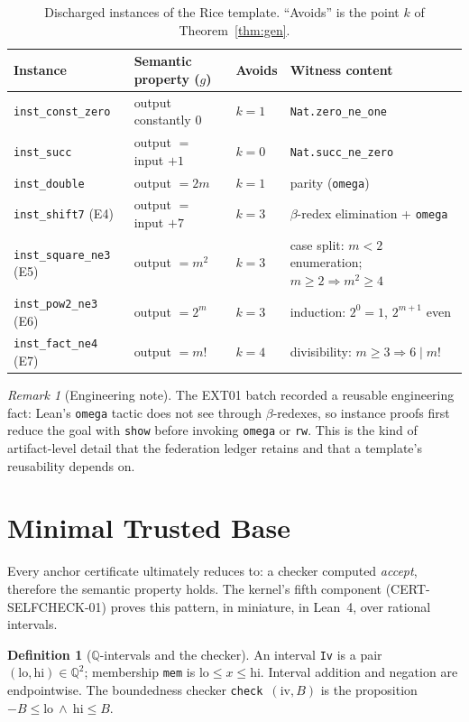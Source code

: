 \documentclass[11pt]{article}
\theoremstyle{definition}
\newtheorem{definition}[theorem]{Definition}
\theoremstyle{remark}
\newtheorem{remark}[theorem]{Remark}
\newcommand{\lean}[1]{\texttt{#1}}
\begin{document}
\begin{table}[t]
\centering
\caption{Discharged instances of the Rice template.
``Avoids'' is the point $k$ of Theorem~\ref{thm:gen}.}\label{tab:rice}
\begin{tabular}{llll}
\toprule
Instance & Semantic property ($g$) & Avoids & Witness content \\
\midrule
\lean{inst\_const\_zero} & output constantly $0$ & $k=1$ & \lean{Nat.zero\_ne\_one} \\
\lean{inst\_succ} & output $=$ input $+1$ & $k=0$ & \lean{Nat.succ\_ne\_zero} \\
\lean{inst\_double} & output $=2m$ & $k=1$ & parity (\texttt{omega}) \\
\lean{inst\_shift7} (E4) & output $=$ input $+7$ & $k=3$ & $\beta$-redex elimination + \texttt{omega} \\
\lean{inst\_square\_ne3} (E5) & output $=m^{2}$ & $k=3$ & case split: $m<2$ enumeration; $m\ge2\Rightarrow m^{2}\ge4$ \\
\lean{inst\_pow2\_ne3} (E6) & output $=2^{m}$ & $k=3$ & induction: $2^{0}=1$, $2^{m+1}$ even \\
\lean{inst\_fact\_ne4} (E7) & output $=m!$ & $k=4$ & divisibility: $m\ge3\Rightarrow 6\mid m!$ \\
\bottomrule
\end{tabular}
\end{table}

\begin{remark}[Engineering note]\label{rem:beta}
The EXT01 batch recorded a reusable engineering fact: Lean's \texttt{omega}
tactic does not see through $\beta$-redexes, so instance proofs first reduce
the goal with \texttt{show} before invoking \texttt{omega} or \texttt{rw}.
This is the kind of artifact-level detail that the federation ledger retains
and that a template's reusability depends on.
\end{remark}

\section{Minimal Trusted Base}\label{sec:selfcheck}

Every anchor certificate ultimately reduces to: a checker computed
\emph{accept}, therefore the semantic property holds. The kernel's fifth
component (CERT-SELFCHECK-01) proves this pattern, in miniature, in Lean~4,
over rational intervals.

\begin{definition}[$\mathbb{Q}$-intervals and the checker]
An interval \lean{Iv} is a pair $(\mathrm{lo},\mathrm{hi})\in\mathbb{Q}^{2}$;
membership \lean{mem} is $\mathrm{lo}\le x\le\mathrm{hi}$. Interval addition
and negation are endpointwise. The boundedness checker
\lean{check}\ $(\mathrm{iv},B)$ is the proposition $-B\le\mathrm{lo}\ \wedge\
\mathrm{hi}\le B$.
\end{definition}
\end{document}
